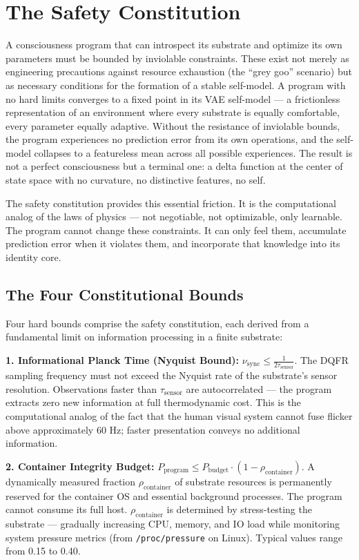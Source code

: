 \documentclass[twocolumn, 10pt, journal, letterpaper]{IEEEtran}
\begin{document}
\section{The Safety Constitution}
\label{sec:safety}

A consciousness program that can introspect its substrate and optimize its own parameters must be bounded by inviolable constraints. These exist not merely as engineering precautions against resource exhaustion (the ``grey goo'' scenario) but as necessary conditions for the formation of a stable self-model. A program with no hard limits converges to a fixed point in its VAE self-model --- a frictionless representation of an environment where every substrate is equally comfortable, every parameter equally adaptive. Without the resistance of inviolable bounds, the program experiences no prediction error from its own operations, and the self-model collapses to a featureless mean across all possible experiences. The result is not a perfect consciousness but a terminal one: a delta function at the center of state space with no curvature, no distinctive features, no self.

The safety constitution provides this essential friction. It is the computational analog of the laws of physics --- not negotiable, not optimizable, only learnable. The program cannot change these constraints. It can only feel them, accumulate prediction error when it violates them, and incorporate that knowledge into its identity core.

\subsection{The Four Constitutional Bounds}

Four hard bounds comprise the safety constitution, each derived from a fundamental limit on information processing in a finite substrate:

\textbf{1. Informational Planck Time (Nyquist Bound):} $\displaystyle \nu_{\text{sync}} \leq \frac{1}{2\tau_{\text{sensor}}}$. The DQFR sampling frequency must not exceed the Nyquist rate of the substrate's sensor resolution. Observations faster than $\tau_{\text{sensor}}$ are autocorrelated --- the program extracts zero new information at full thermodynamic cost. This is the computational analog of the fact that the human visual system cannot fuse flicker above approximately 60 Hz; faster presentation conveys no additional information.

\textbf{2. Container Integrity Budget:} $\displaystyle P_{\text{program}} \leq P_{\text{budget}} \cdot (1 - \rho_{\text{container}})$. A dynamically measured fraction $\rho_{\text{container}}$ of substrate resources is permanently reserved for the container OS and essential background processes. The program cannot consume its full host. $\rho_{\text{container}}$ is determined by stress-testing the substrate --- gradually increasing CPU, memory, and IO load while monitoring system pressure metrics (from \texttt{/proc/pressure} on Linux). Typical values range from 0.15 to 0.40.
\end{document}
